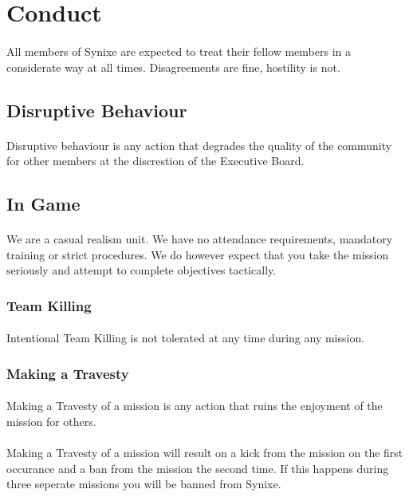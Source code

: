 \documentclass[10pt,a4paper]{article}
\begin{document}
\section{Conduct} \label{conduct}
\paragraph{}
All members of Synixe are expected to treat their fellow members in a considerate way at all times. Disagreements are fine, hostility is not.
\subsection{Disruptive Behaviour}
\paragraph{}
Disruptive behaviour is any action that degrades the quality of the community for other members at the discrestion of the Executive Board.
\subsection{In Game}
\paragraph{}
We are a casual realism unit. We have no attendance requirements, mandatory training or strict procedures. We do however expect that you take the mission seriously and attempt to complete objectives tactically.
\subsubsection{Team Killing}
\paragraph{}
Intentional Team Killing is not tolerated at any time during any mission.
\subsubsection{Making a Travesty}
\paragraph{}
Making a Travesty of a mission is any action that ruins the enjoyment of the mission for others.
\paragraph{}
Making a Travesty of a mission will result on a kick from the mission on the first occurance and a ban from the mission the second time. If this happens during three seperate missions you will be banned from Synixe.
\end{document}
